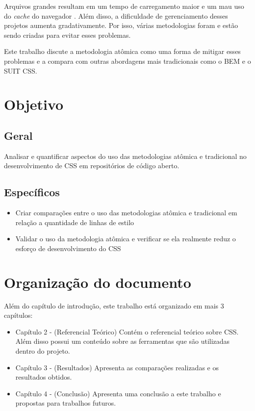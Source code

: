 Arquivos grandes resultam em um tempo de carregamento maior e um mau uso
do \emph{cache} do navegador \cite{ardeljan}. Além disso, a dificuldade de gerenciamento
desses projetos aumenta gradativamente. Por isso, várias metodologias
foram e estão sendo criadas para evitar esses problemas.

Este trabalho discute a metodologia atômica como uma forma de mitigar esses problemas e a compara com outras abordagens mais tradicionais como o BEM e o SUIT CSS. 

\hypertarget{objetivo}{%
\section{Objetivo}\label{objetivo}}

\hypertarget{geral}{%
\subsection{Geral}\label{geral}}

Analisar e quantificar aspectos do uso das metodologias atômica e tradicional no desenvolvimento de CSS em repositórios de código aberto.

\hypertarget{especuxedficos}{%
\subsection{Específicos}\label{especuxedficos}}

\begin{itemize}
\tightlist
\item
  Criar comparações entre o uso das metodologias atômica e tradicional em relação a quantidade de linhas de estilo
\item
  Validar o uso da metodologia atômica e verificar se ela realmente reduz o esforço de desenvolvimento do CSS
\end{itemize}

\hypertarget{organizauxe7uxe3o-do-documento}{%
\section{Organização do
documento}\label{organizauxe7uxe3o-do-documento}}

Além do capítulo de introdução, este trabalho está organizado em mais
3 capítulos:

\begin{itemize}
\tightlist
\item
  Capítulo 2 - (Referencial Teórico) Contém o referencial teórico sobre CSS. Além disso possui um conteúdo sobre as ferramentas que são utilizadas dentro do projeto.
\item
  Capítulo 3 - (Resultados) Apresenta as comparações realizadas e os resultados obtidos.
\item
  Capítulo 4 - (Conclusão) Apresenta uma conclusão a este trabalho e propostas para trabalhos futuros.
\end{itemize}

